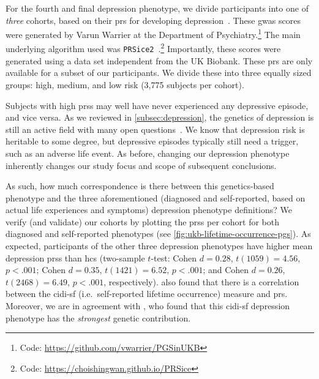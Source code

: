 For the fourth and final depression phenotype, we divide participants into one of \emph{three} cohorts, based on their \gls{prs} for developing depression~\parencite{Bycroft2018}.
These \gls{gwas} scores were generated by Varun Warrier at the Department of Psychiatry.\footnote{Code: \url{https://github.com/vwarrier/PGSinUKB}}
The main underlying algorithm used was \texttt{PRSice2}~\parencite{Choi2019}.\footnote{Code: \url{https://choishingwan.github.io/PRSice}}
Importantly, these scores were generated using a data set independent from the UK Biobank.
These \gls{prs} are only available for a subset of our participants.
We divide these into three equally sized groups: high, medium, and low risk (3,775 subjects per cohort).

Subjects with high \glspl{prs} may well have never experienced any depressive episode, and vice versa.
As we reviewed in \cref{subsec:depression}, the genetics of depression is still an active field with many open questions~\parencite{Ormel2019}.
We know that depression risk is heritable to some degree, but depressive episodes typically still need a trigger, such as an adverse life event.
As before, changing our depression phenotype inherently changes our study focus and scope of subsequent conclusions.

As such, how much correspondence is there between this genetics-based phenotype and the three aforementioned (diagnosed and self-reported, based on actual life experiences and symptoms) depression phenotype definitions?
We verify (and validate) our cohorts by plotting the \glspl{prs} per cohort for both diagnosed and self-reported phenotypes (see \cref{fig:ukb-lifetime-occurrence-pgs}).
As expected, participants of the other three depression phenotypes have higher mean depression \glspl{prs} than \glspl{hc} (two-sample $t$-test: Cohen $d = 0.28$, $t(1059) = 4.56$, $p < .001$; Cohen $d = 0.35$, $t(1421) = 6.52$, $p < .001$; and Cohen $d = 0.26$, $t(2468) = 6.49$, $p < .001$, respectively).
\textcite{Glanville2021} also found that there is a correlation between the \gls{cidi-sf} (i.e.~self-reported lifetime occurrence) measure and \gls{prs}.
Moreover, we are in agreement with \textcite{Cai2020}, who found that this \gls{cidi-sf} depression phenotype has the \emph{strongest} genetic contribution.


